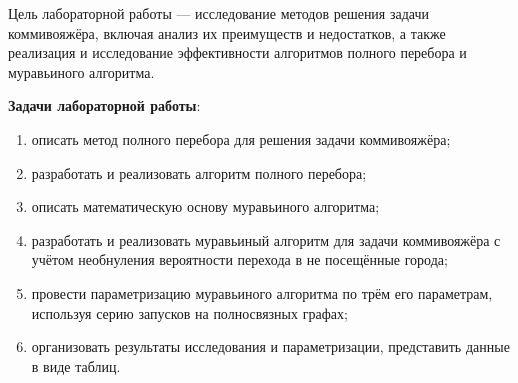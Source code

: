 
Цель лабораторной работы — исследование методов решения задачи коммивояжёра, включая анализ их преимуществ и недостатков, а также реализация и исследование эффективности алгоритмов полного перебора и муравьиного алгоритма.

\vspace{0.5cm}
\textbf{Задачи лабораторной работы}:
\begin{enumerate}
    \item описать метод полного перебора для решения задачи коммивояжёра;
    \item разработать и реализовать алгоритм полного перебора;
    \item описать математическую основу муравьиного алгоритма;
    \item разработать и реализовать муравьиный алгоритм для задачи коммивояжёра с учётом необнуления вероятности перехода в не посещённые города;
    \item провести параметризацию муравьиного алгоритма по трём его параметрам, используя серию запусков на полносвязных графах;
    \item организовать результаты исследования и параметризации, представить данные в виде таблиц.
\end{enumerate}

\clearpage
